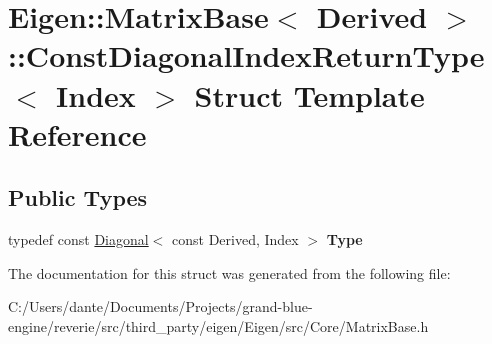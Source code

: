 \hypertarget{struct_eigen_1_1_matrix_base_1_1_const_diagonal_index_return_type}{}\section{Eigen\+::Matrix\+Base$<$ Derived $>$\+::Const\+Diagonal\+Index\+Return\+Type$<$ Index $>$ Struct Template Reference}
\label{struct_eigen_1_1_matrix_base_1_1_const_diagonal_index_return_type}
\subsection*{Public Types}
\begin{DoxyCompactItemize}
\item 
\mbox{\label{struct_eigen_1_1_matrix_base_1_1_const_diagonal_index_return_type_abb869f9b5b8910a80171a10b85bc8dd8}} 
typedef const \mbox{\hyperlink{class_eigen_1_1_diagonal}{Diagonal}}$<$ const Derived, Index $>$ {\bfseries Type}
\end{DoxyCompactItemize}


The documentation for this struct was generated from the following file\+:\begin{DoxyCompactItemize}
\item 
C\+:/\+Users/dante/\+Documents/\+Projects/grand-\/blue-\/engine/reverie/src/third\+\_\+party/eigen/\+Eigen/src/\+Core/Matrix\+Base.\+h\end{DoxyCompactItemize}
